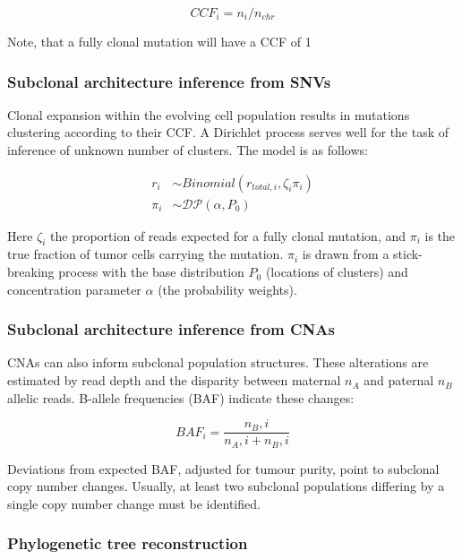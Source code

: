 {    \begin{equation}
        CCF_i = n_i / n_{chr}
    \end{equation}

    Note, that a fully clonal mutation will have a \ac{CCF} of 1

    \subsubsection*{Subclonal architecture inference from \acp{SNV}}

    Clonal expansion within the evolving cell population results in mutations clustering according to their \ac{CCF}. A Dirichlet process serves well for the task of inference of unknown number of clusters. The model is as follows:

    \begin{align}
        r_i &\sim Binomial(r_{total,i},\zeta_i\pi_i) \\
        \pi_i &\sim \mathcal{DP}(\alpha, P_0) 
    \end{align}

    Here $\zeta_i$  the proportion of reads expected for a fully clonal mutation, and $\pi_i$ is the true fraction of tumor cells carrying the mutation. $\pi_i$ is drawn from a stick-breaking process with the base distribution $P_0$ (locations of clusters) and concentration parameter $\alpha$ (the probability weights).

    \subsubsection*{Subclonal architecture inference from \acp{CNA}}

    \acp{CNA} can also inform subclonal population structures. These alterations are estimated by read depth and the disparity between maternal $n_A$  and paternal $n_B$ allelic reads. B-allele frequencies (BAF) indicate these changes:

    \begin{equation}
        BAF_i = \frac{n_B,i }{n_A,i + n_B,i} 
    \end{equation}
    
    Deviations from expected BAF, adjusted for tumour purity, point to subclonal copy number changes. Usually, at least two subclonal populations differing by a single copy number change must be identified.

    \subsubsection*{Phylogenetic tree reconstruction}

}
